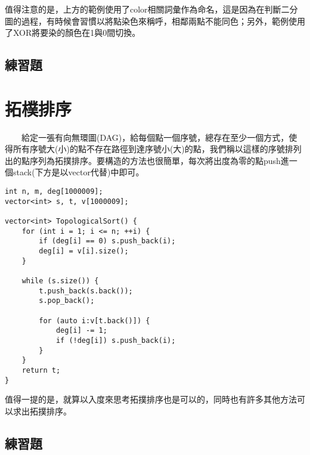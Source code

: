 值得注意的是，上方的範例使用了color相關詞彙作為命名，這是因為在判斷二分圖的過程，有時候會習慣以將點染色來稱呼，相鄰兩點不能同色；另外，範例使用了XOR將要染的顏色在1與0間切換。

\subsection{練習題}




\section{拓樸排序}

　　給定一張有向無環圖(DAG)，給每個點一個序號，總存在至少一個方式，使得所有序號大(小)的點不存在路徑到達序號小(大)的點，我們稱以這樣的序號排列出的點序列為拓撲排序。要構造的方法也很簡單，每次將出度為零的點push進一個stack(下方是以vector代替)中即可。

\clearpage

\begin{lstlisting}[caption=拓樸排序]
int n, m, deg[1000009];
vector<int> s, t, v[1000009];

vector<int> TopologicalSort() {
	for (int i = 1; i <= n; ++i) {
		if (deg[i] == 0) s.push_back(i);
		deg[i] = v[i].size();
	}
	
	while (s.size()) {
		t.push_back(s.back());
		s.pop_back();
		
		for (auto i:v[t.back()]) {
			deg[i] -= 1;
			if (!deg[i]) s.push_back(i);
		}
	}
	return t;
}
\end{lstlisting}

值得一提的是，就算以入度來思考拓撲排序也是可以的，同時也有許多其他方法可以求出拓撲排序。

\subsection{練習題}



